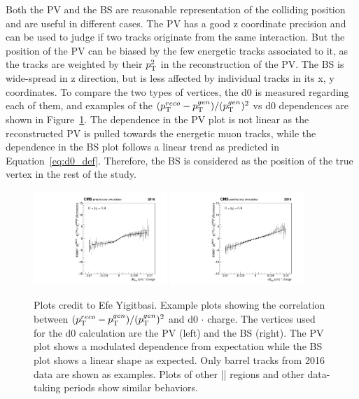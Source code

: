 Both the PV and the BS are reasonable representation of the colliding position and are useful in different cases.
The PV has a good z coordinate precision and can be used to judge if two tracks originate from the same interaction. 
But the position of the PV can be biased by the few energetic tracks associated to it, 
as the tracks are weighted by their $p_{\mathrm{T}}^{2}$ in the reconstruction of the PV.
The BS is wide-spread in z direction, but is less affected by individual tracks in its x, y coordinates.
To compare the two types of vertices, the d0 is measured regarding each of them, 
and examples of the $(p_{\mathrm{T}}^{reco}-p_{\mathrm{T}}^{gen})/ (p_{\mathrm{T}}^{gen})^{2}$ vs d0 dependences are shown in Figure~\ref{fig:pv_vs_bs_fits}.
The dependence in the PV plot is not linear as the reconstructed PV is pulled towards the energetic muon tracks,
while the dependence in the BS plot follows a linear trend as predicted in Equation~\ref{eq:d0_def}.
Therefore, the BS is considered as the position of the true vertex in the rest of the study.

\begin{figure}[!htb]
      \centering
      \captionsetup{justification=justified}
      \includegraphics[width=0.45\textwidth]{pics/muon_corr/GeoFit/fit_results/d0_pt_PV_eg.pdf}
      \includegraphics[width=0.45\textwidth]{pics/muon_corr/GeoFit/fit_results/d0_pt_BS_eg.pdf}
      \caption{Plots credit to Efe Yigitbasi.
               Example plots showing the correlation between $(p_{\mathrm{T}}^{reco}-p_{\mathrm{T}}^{gen})/ (p_{\mathrm{T}}^{gen})^{2}$ and d0 $\cdot$ charge.
               The vertices used for the d0 calculation are the PV (left) and the BS (right). 
               The PV plot shows a modulated dependence from expectation while the BS plot shows a linear shape as expected.
               Only barrel tracks from 2016 data are shown as examples. 
               Plots of other |\eta| regions and other data-taking periods show similar behaviors.
               }
      \label{fig:pv_vs_bs_fits}
\end{figure}

